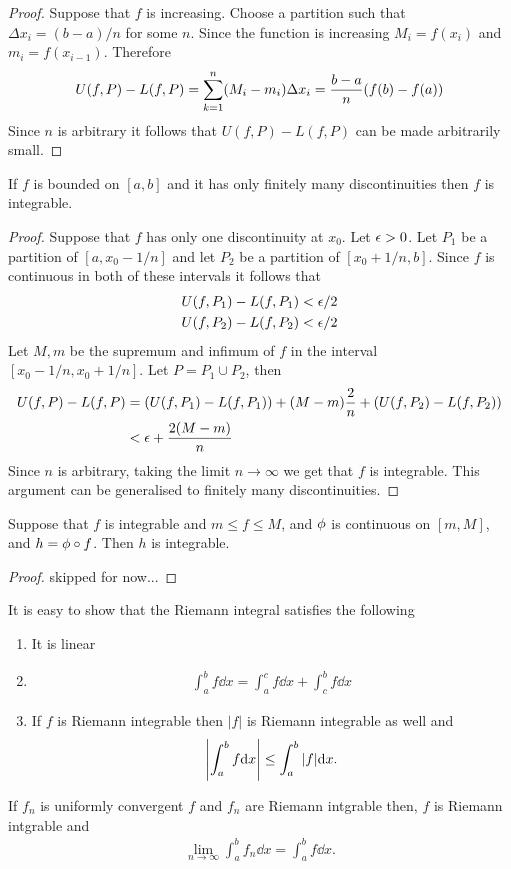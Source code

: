 \begin{proof}
  Suppose that $f$ is increasing. Choose a partition such that $\Delta x_i = (b-a)/n$ for some $n$. Since the function is increasing $M_i = f(x_i)$ and $m_i = f(x_{i-1})$. Therefore
  \begin{align*}
    U(f,P) - L(f,P) = \sum_{k=1}^n (M_i - m_i) \Delta x_i = \frac{b-a}{n} (f(b)-f(a))
  \end{align*}
  Since $n$ is arbitrary it follows that $U(f,P) - L(f,P)$ can be made arbitrarily small.
\end{proof}
\begin{theorem}
  If $f$ is bounded on $[a,b]$ and it has only finitely many discontinuities then $f$ is integrable.
\end{theorem}
\begin{proof}
  Suppose that $f$ has only one discontinuity at $x_0$. Let $\epsilon>0$. Let $P_1$ be a partition of $[a,x_0-1/n]$ and let $P_2$ be a partition of $[x_0+1/n, b]$. Since $f$ is continuous in both of these intervals it follows that
  \begin{align*}
    U(f,P_1) -L(f,P_1) < \epsilon/2\\
    U(f,P_2) -L(f,P_2) < \epsilon/2
  \end{align*}
  Let $M,m$ be the supremum and infimum of $f$ in the interval $[x_0-1/n, x_0 + 1/n]$. Let $P = P_1\cup P_2$, then
  \begin{align*}
    U(f,P) - L(f,P) &= (U(f,P_1) - L(f,P_1)) + (M-m)\frac{2}{n} + (U(f,P_2) - L(f,P_2))\\
                    &< \epsilon + \frac{2(M-m)}{n}
  \end{align*}
  Since $n$ is arbitrary, taking the limit $n\to \infty$ we get that $f$ is integrable. This argument can be generalised to finitely many discontinuities.
\end{proof}
\begin{theorem}
  Suppose that $f$ is integrable and $m\leq f \leq M$, and $\phi$ is continuous on $[m,M]$, and $h = \phi\circ f$. Then $h$ is integrable.
\end{theorem}
\begin{proof}
  skipped for now...
\end{proof}
\begin{remark}
  It is easy to show that the Riemann integral satisfies the following
  \begin{enumerate}
    \item It is linear
    \item \begin{align*}
      \int^b_a f \dd x =\int^c_a f \dd x +\int^b_c f \dd x
      \end{align*}
    \item If $f$ is Riemann integrable then $|f|$ is Riemann integrable as well and
      \begin{align*}
       \left|\int^b_a f \dd x \right| \leq \int^b_a |f| \dd x.
      \end{align*}
  \end{enumerate}
\end{remark}
\begin{theorem}
  If $f_n$ is uniformly convergent $f$ and $f_n$ are Riemann intgrable then, $f$ is Riemann intgrable and 
  \begin{align*}
    \lim_{n\to \infty} \int^b_a f_n \dd x =\int^b_a f\dd x.
  \end{align*}
\end{theorem}
